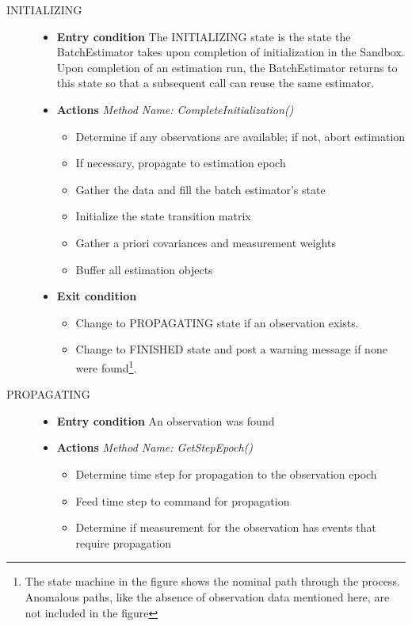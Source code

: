 \begin{description}
\item[INITIALIZING]\hspace{1pt}
\begin{itemize}
\item \textbf{Entry condition} The INITIALIZING state is the state the BatchEstimator takes upon completion of initialization in the Sandbox.  Upon completion of an estimation run, the BatchEstimator returns to this state so that a subsequent call can reuse the same estimator.
\item \textbf{Actions} \textit{Method Name: CompleteInitialization()}
\begin{itemize}
\item Determine if any observations are available; if not, abort estimation 
\item If necessary, propagate to estimation epoch
\item Gather the data and fill the batch estimator's state
\item Initialize the state transition matrix
\item Gather a priori covariances and measurement weights
\item Buffer all estimation objects
\end{itemize}
\item \textbf{Exit condition}
\begin{itemize}
\item Change to PROPAGATING state if an observation exists.  
\item Change to FINISHED state and post a warning message if none were found\footnote{The state machine in the figure shows the nominal path through the process.  Anomalous paths, like the absence of observation data mentioned here, are not included in the figure}.
\end{itemize}
\end{itemize}
\item[PROPAGATING]\hspace{1pt}
\begin{itemize}
\item \textbf{Entry condition}  An observation was found
\item \textbf{Actions} \textit{Method Name:  GetStepEpoch()}
\begin{itemize}
\item Determine time step for propagation to the observation epoch
\item Feed time step to command for propagation
\item Determine if measurement for the observation has events that require propagation

\end{itemize}
\end{itemize}
\end{description}
